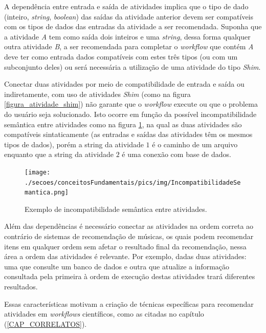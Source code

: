 A dependência entre entrada e saída de atividades implica que o tipo de dado (inteiro, \emph{string}, \emph{boolean}) das saídas da atividade anterior devem ser compatíveis com os tipos de dados das entradas da atividade a ser recomendada. Suponha que a atividade \emph{A} tem como saída dois inteiros e uma \emph{string}, dessa forma qualquer outra atividade \emph{B}, a ser recomendada para completar o \emph{workflow} que contém \emph{A} deve ter como entrada dados compatíveis com estes três tipos (ou com um subconjunto deles) ou será necessária a utilização de uma atividade do tipo \emph{Shim}.

Conectar duas atividades por meio de compatibilidade de entrada e saída ou indiretamente, com uso de atividades \emph{Shim} (como na figura \ref{figura_atividade_shim}) não garante que o \emph{workflow} execute ou que o problema do usuário seja solucionado. Isto ocorre em função da possível incompatibilidade semântica entre atividades como na figura \ref{figura_Incompatibilidade_Semantica}, 
na qual as duas atividades são compatíveis sintaticamente (as entradas e saídas das atividades têm os mesmos tipos de dados), porém a string da atividade \(1\) é o caminho de um arquivo enquanto que a string da atividade \(2\) é uma conexão com base de dados.
\begin{figure}[!hbt]
    \centering  
    \caption{Exemplo de incompatibilidade semântica entre atividades.}
    \texttt{[image: ./secoes/conceitosFundamentais/pics/img/IncompatibilidadeSemantica.png]}    
	\label{figura_Incompatibilidade_Semantica}
\end{figure}

Além das dependências é necessário conectar as atividades na ordem correta ao contrário de sistemas de recomendação de músicas, os quais podem recomendar itens em qualquer ordem sem afetar o resultado final da recomendação, nessa área a ordem das atividades é relevante. Por exemplo, dadas duas atividades: uma que consulte um banco de dados e outra que atualize a informação consultada pela primeira à ordem de execução destas atividades trará diferentes resultados.

Essas características motivam a criação de técnicas específicas para recomendar atividades em \emph{workflows} científicos, como as citadas no capítulo (\ref{CAP_CORRELATOS}).


